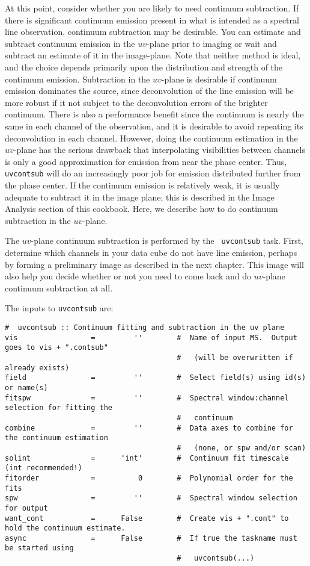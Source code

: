 At this point, consider whether you are likely to need continuum
subtraction.  If there is significant continuum emission present in
what is intended as a spectral line observation, continuum subtraction
may be desirable.  You can estimate and subtract continuum emission in
the $uv$-plane prior to imaging or wait and subtract an estimate of it
in the image-plane.  Note that neither method is ideal, and the choice
depends primarily upon the distribution and strength of the continuum
emission.  Subtraction in the $uv$-plane is desirable if continuum emission dominates
the source, since deconvolution of the line emission will be more robust
if it not subject to the deconvolution errors of the brighter continuum.
There is also a performance benefit since the continuum is nearly the same
in each channel of the observation, and it is desirable to avoid repeating
its deconvolution in each channel.  However, doing the continuum
estimation in the $uv$-plane has the serious drawback that interpolating
visibilities between channels is only a good approximation for emission
from near the phase center.  Thus, {\tt uvcontsub} will do an increasingly
poor job for emission distributed further from the phase center. 
If the continuum emission is relatively weak,
it is usually adequate to subtract it in the image plane; this is
described in the Image Analysis section of this cookbook.  Here, we
describe how to do continuum subtraction in the $uv$-plane.

The $uv$-plane continuum subtraction is performed by the {\tt
  uvcontsub} task.  First, determine which channels in your data cube
do not have line emission, perhaps by forming a preliminary image as
described in the next chapter.  This image will also help you decide
whether or not you need to come back and do $uv$-plane continuum
subtraction at all. 


The inputs to {\tt uvcontsub} are:
\small
\begin{verbatim}
#  uvcontsub :: Continuum fitting and subtraction in the uv plane
vis                 =         ''        #  Name of input MS.  Output goes to vis + ".contsub"
                                        #   (will be overwritten if already exists)
field               =         ''        #  Select field(s) using id(s) or name(s)
fitspw              =         ''        #  Spectral window:channel selection for fitting the
                                        #   continuum
combine             =         ''        #  Data axes to combine for the continuum estimation
                                        #   (none, or spw and/or scan)
solint              =      'int'        #  Continuum fit timescale (int recommended!)
fitorder            =          0        #  Polynomial order for the fits
spw                 =         ''        #  Spectral window selection for output
want_cont           =      False        #  Create vis + ".cont" to hold the continuum estimate.
async               =      False        #  If true the taskname must be started using
                                        #   uvcontsub(...)
\end{verbatim}
\normalsize


